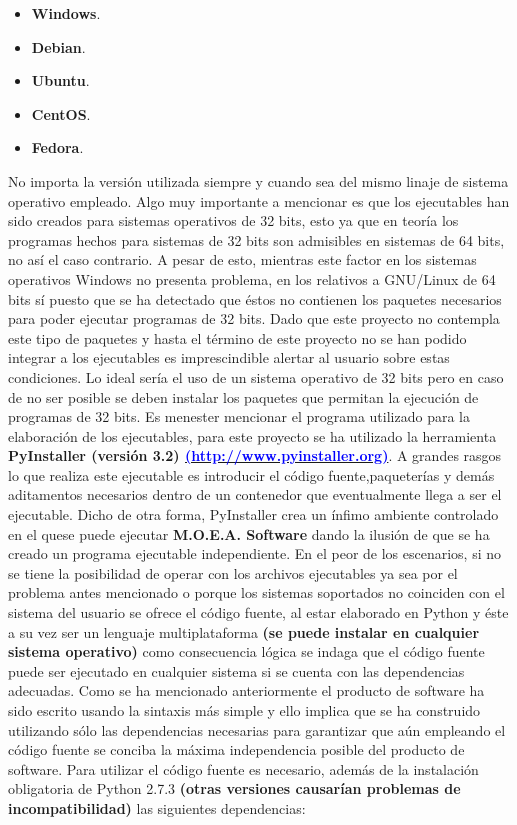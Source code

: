 \documentclass[class=report, crop=false]{standalone}
\begin{document}
\begin{itemize}
\item \textbf{Windows}.
\item \textbf{Debian}.
\item \textbf{Ubuntu}.
\item \textbf{CentOS}.
\item \textbf{Fedora}.
\end{itemize}

No importa la versión utilizada siempre y cuando sea del mismo 
linaje de sistema operativo empleado.\medskip\break
Algo muy importante a mencionar es que los ejecutables han sido 
creados para sistemas operativos de 32 bits, esto ya que en 
teoría los programas hechos para sistemas de 32 bits son admisibles 
en sistemas de 64 bits, no así el caso contrario.\break
A pesar de esto, mientras este factor en los sistemas operativos 
Windows no presenta problema, en los relativos a GNU/Linux de 
64 bits sí puesto que se ha detectado que éstos no contienen los 
paquetes necesarios para poder ejecutar programas de 32 bits.\break
Dado que este proyecto no contempla este tipo de paquetes y 
hasta el término de este proyecto no se han podido integrar a 
los ejecutables es imprescindible alertar al usuario sobre estas 
condiciones.\break
Lo ideal sería el uso de un sistema operativo de 32 bits pero en 
caso de no ser posible se deben instalar los paquetes que permitan 
la ejecución de programas de 32 bits.\medskip\break
Es menester mencionar el programa utilizado para la elaboración 
de los ejecutables, para este proyecto se ha utilizado la herramienta 
\textbf{PyInstaller (versión 3.2) \href{http://www.pyinstaller.org}{\break\textcolor{blue}{(http://www.pyinstaller.org)}}}.\break
A grandes rasgos lo que realiza este ejecutable es introducir el 
código fuente,paqueterías y demás aditamentos necesarios dentro 
de un contenedor que eventualmente llega a ser el ejecutable.\break
Dicho de otra forma, PyInstaller crea un ínfimo ambiente controlado 
en el quese puede ejecutar \textbf{M.O.E.A. Software} dando la 
ilusión de que se ha creado un programa ejecutable independiente.\medskip\break
En el peor de los escenarios, si no se tiene la posibilidad de 
operar con los archivos ejecutables ya sea por el problema antes 
mencionado o porque los sistemas soportados no coinciden con el 
sistema del usuario se ofrece el código fuente, al estar elaborado 
en Python y éste a su vez ser un lenguaje multiplataforma 
\textbf{(se puede instalar en cualquier sistema operativo)} como 
consecuencia lógica se indaga que el código fuente puede ser 
ejecutado en cualquier sistema si se cuenta con las dependencias 
adecuadas.\medskip\break
Como se ha mencionado anteriormente el producto de software ha 
sido escrito usando la sintaxis más simple y ello implica que se 
ha construido utilizando sólo las dependencias necesarias para 
garantizar que aún empleando el código fuente se conciba la máxima 
independencia posible del producto de software.\medskip\break
Para utilizar el código fuente es necesario, además de la instalación 
obligatoria de Python 2.7.3 \textbf{(otras versiones causarían problemas de incompatibilidad)}
las siguientes dependencias:
\end{document}
